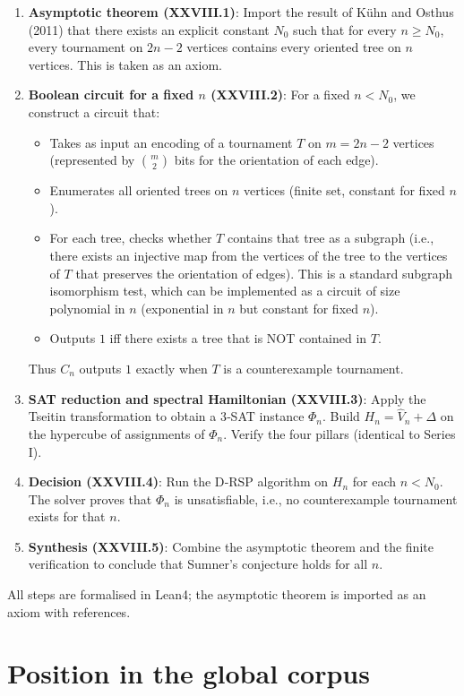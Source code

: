 \documentclass[11pt,a4paper]{article}
\begin{document}
\begin{enumerate}
\item \textbf{Asymptotic theorem (XXVIII.1)}: Import the result of Kühn and Osthus (2011) that there exists an explicit constant $N_0$ such that for every $n \ge N_0$, every tournament on $2n-2$ vertices contains every oriented tree on $n$ vertices. This is taken as an axiom.
\item \textbf{Boolean circuit for a fixed $n$ (XXVIII.2)}: For a fixed $n < N_0$, we construct a circuit that:
   \begin{itemize}
   \item Takes as input an encoding of a tournament $T$ on $m = 2n-2$ vertices (represented by $\binom{m}{2}$ bits for the orientation of each edge).
   \item Enumerates all oriented trees on $n$ vertices (finite set, constant for fixed $n$).
   \item For each tree, checks whether $T$ contains that tree as a subgraph (i.e., there exists an injective map from the vertices of the tree to the vertices of $T$ that preserves the orientation of edges). This is a standard subgraph isomorphism test, which can be implemented as a circuit of size polynomial in $n$ (exponential in $n$ but constant for fixed $n$).
   \item Outputs $1$ iff there exists a tree that is NOT contained in $T$.
   \end{itemize}
   Thus $C_n$ outputs $1$ exactly when $T$ is a counterexample tournament.
\item \textbf{SAT reduction and spectral Hamiltonian (XXVIII.3)}: Apply the Tseitin transformation to obtain a 3‑SAT instance $\Phi_n$. Build $H_n = \hat{V}_n + \Delta$ on the hypercube of assignments of $\Phi_n$. Verify the four pillars (identical to Series I).
\item \textbf{Decision (XXVIII.4)}: Run the D‑RSP algorithm on $H_n$ for each $n < N_0$. The solver proves that $\Phi_n$ is unsatisfiable, i.e., no counterexample tournament exists for that $n$.
\item \textbf{Synthesis (XXVIII.5)}: Combine the asymptotic theorem and the finite verification to conclude that Sumner's conjecture holds for all $n$.
\end{enumerate}

All steps are formalised in Lean4; the asymptotic theorem is imported as an axiom with references.

\section{Position in the global corpus}
\end{document}
